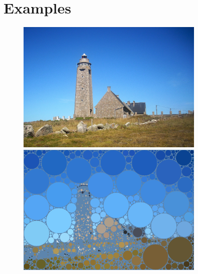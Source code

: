 \documentclass[12pt, a4paper]{article}
\begin{document}
\section{Examples}

\begin{center}
\begin{figure}[H]
\centering
\includegraphics[width=9cm]{./test02.png}
\includegraphics[width=9cm]{./out02.png}
\end{figure}
\end{center}
\end{document}
